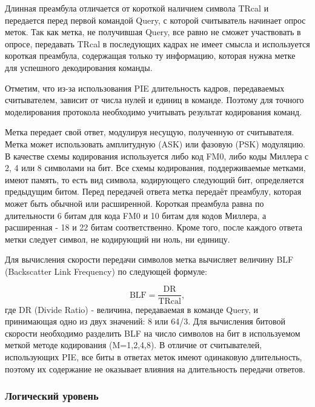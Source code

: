 Длинная преамбула отличается от короткой наличием символа TRcal и передается перед первой командой Query, с которой считыватель начинает опрос меток. Так как метка, не получившая Query, все равно не сможет участвовать в опросе, передавать TRcal в последующих кадрах не имеет смысла и используется короткая преамбула, содержащая только ту информацию, которая нужна метке для успешного декодирования команды.

Отметим, что из-за использования PIE длительность кадров, передаваемых считывателем, зависит от числа нулей и единиц в команде. Поэтому для точного моделирования протокола необходимо учитывать результат кодирования команд.

Метка передает свой ответ, модулируя несущую, полученную от считывателя. Метка может использовать амплитудную (ASK) или фазовую (PSK) модуляцию. В качестве схемы кодирования используется либо код FM0, либо коды Миллера с 2, 4 или 8 символами на бит. Все схемы кодирования, поддерживаемые метками, имеют память, то есть вид символа, кодирующего следующий бит, определяется предыдущим битом. Перед передачей ответа метка передаёт преамбулу, которая может быть обычной или расширенной. Короткая преамбула равна по длительности 6 битам для кода FM0 и 10 битам для кодов Миллера, а расширенная - 18 и 22 битам соответственно. Кроме того, после каждого ответа метки следует символ, не кодирующий ни ноль, ни единицу.

Для вычисления скорости передачи символов метка вычисляет величину BLF (Backscatter Link Frequency) по следующей формуле:

$$
\text{BLF} = \frac{\text{DR}}{\text{TRcal}},
$$
где DR (Divide Ratio) - величина, передаваемая в команде Query, и принимающая одно из двух значений: 8 или 64/3. Для вычисления битовой скорости необходимо разделить BLF на число символов на бит в используемом меткой методе кодирования (M=1,2,4,8). В отличие от считывателей, использующих PIE, все биты в ответах меток имеют одинаковую длительность, поэтому их содержание не оказывает влияния на длительность передачи ответов.




\subsubsection{Логический уровень}

